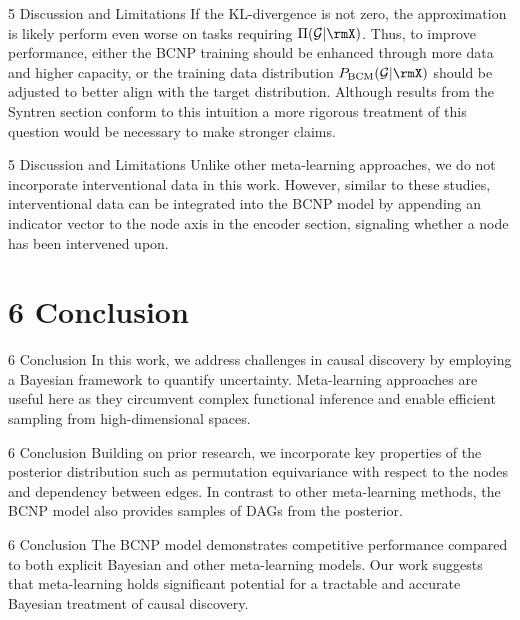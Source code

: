 \documentclass[aspectratio=169,10pt]{beamer}
\begin{document}
\begin{frame}{5 Discussion and Limitations}
\small
If the KL-divergence is not zero, the approximation is likely perform even worse on tasks requiring $\Pi(\mathcal{G}| \rmX)$. Thus, to improve performance, either the BCNP training should be enhanced through more data and higher capacity, or the training data distribution $P_{\text{BCM}}(\mathcal{G}| \rmX)$ should be adjusted to better align with the target distribution. Although results from the Syntren section conform to this intuition a more rigorous treatment of this question would be necessary to make stronger claims.
\end{frame}

\begin{frame}{5 Discussion and Limitations}
Unlike other meta-learning approaches, we do not incorporate interventional data in this work. However, similar to these studies, interventional data can be integrated into the BCNP model by appending an indicator vector to the node axis in the encoder section, signaling whether a node has been intervened upon.
\end{frame}

\section{6 Conclusion}

\begin{frame}{6 Conclusion}
In this work, we address challenges in causal discovery by employing a Bayesian framework to quantify uncertainty. Meta-learning approaches are useful here as they circumvent complex functional inference and enable efficient sampling from high-dimensional spaces.
\end{frame}

\begin{frame}{6 Conclusion}
Building on prior research, we incorporate key properties of the posterior distribution such as permutation equivariance with respect to the nodes and dependency between edges. In contrast to other meta-learning methods, the BCNP model also provides samples of DAGs from the posterior.
\end{frame}

\begin{frame}{6 Conclusion}
The BCNP model demonstrates competitive performance compared to both explicit Bayesian and other meta-learning models. Our work suggests that meta-learning holds significant potential for a tractable and accurate Bayesian treatment of causal discovery.
\end{frame}
\end{document}

